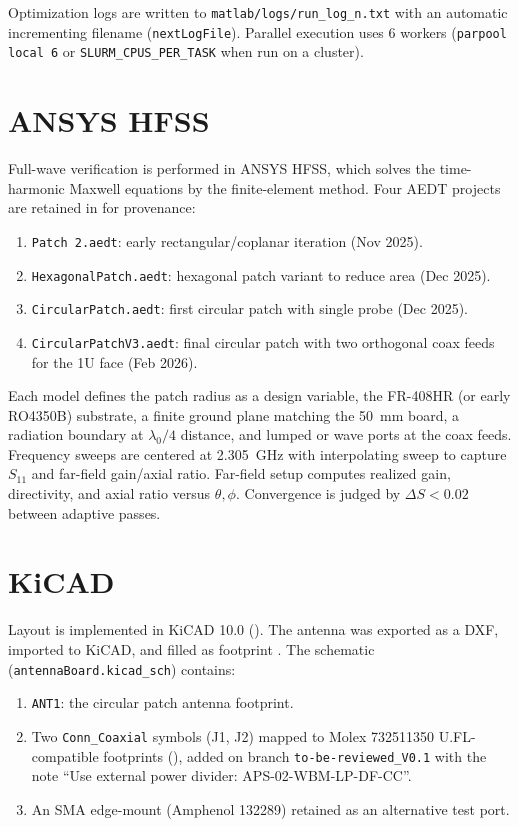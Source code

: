 Optimization logs are written to \texttt{matlab/logs/run\_log\_n.txt} with an automatic incrementing filename (\texttt{nextLogFile}). Parallel execution uses 6 workers (\texttt{parpool local 6} or \texttt{SLURM\_CPUS\_PER\_TASK} when run on a cluster).

\section{ANSYS HFSS}

Full-wave verification is performed in ANSYS HFSS, which solves the time-harmonic Maxwell equations by the finite-element method. Four AEDT projects are retained in  for provenance:

\begin{enumerate}[itemsep=-1ex]
    \item \texttt{Patch 2.aedt}: early rectangular/coplanar iteration (Nov 2025).
    \item \texttt{HexagonalPatch.aedt}: hexagonal patch variant to reduce area (Dec 2025).
    \item \texttt{CircularPatch.aedt}: first circular patch with single probe (Dec 2025).
    \item \texttt{CircularPatchV3.aedt}: final circular patch with two orthogonal coax feeds for the 1U face (Feb 2026).
\end{enumerate}

Each model defines the patch radius as a design variable, the FR-408HR (or early RO4350B) substrate, a finite ground plane matching the 50~mm board, a radiation boundary at $\lambda_0/4$ distance, and lumped or wave ports at the coax feeds. Frequency sweeps are centered at 2.305~GHz with interpolating sweep to capture $S_{11}$ and far-field gain/axial ratio. Far-field setup computes realized gain, directivity, and axial ratio versus $\theta,\phi$. Convergence is judged by $\Delta S < 0.02$ between adaptive passes.

\section{KiCAD}

Layout is implemented in KiCAD 10.0 (). The antenna was exported as a DXF, imported to KiCAD, and filled as footprint . The schematic (\texttt{antennaBoard.kicad\_sch}) contains:

\begin{enumerate}[itemsep=-1ex]
    \item \texttt{ANT1}: the circular patch antenna footprint.
    \item Two \texttt{Conn\_Coaxial} symbols (J1, J2) mapped to Molex 732511350 U.FL-compatible footprints (), added on branch \texttt{to-be-reviewed\_V0.1} with the note “Use external power divider: APS-02-WBM-LP-DF-CC”.
    \item An SMA edge-mount (Amphenol 132289) retained as an alternative test port.
\end{enumerate}

